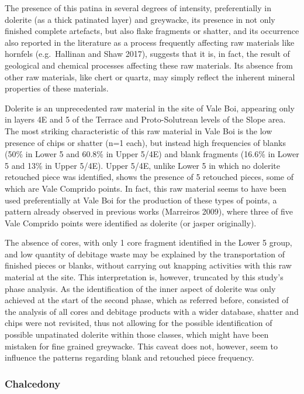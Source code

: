 \documentclass[12pt,twoside]{reedthesis}
\begin{document}
The presence of this patina in several degrees of intensity, preferentially in dolerite (as a thick patinated layer) and greywacke, its presence in not only finished complete artefacts, but also flake fragments or shatter, and its occurrence also reported in the literature as a process frequently affecting raw materials like hornfels (e.g.~Hallinan and Shaw 2017), suggests that it is, in fact, the result of geological and chemical processes affecting these raw materials. Its absence from other raw materials, like chert or quartz, may simply reflect the inherent mineral properties of these materials.

Dolerite is an unprecedented raw material in the site of Vale Boi, appearing only in layers 4E and 5 of the Terrace and Proto-Solutrean levels of the Slope area. The most striking characteristic of this raw material in Vale Boi is the low presence of chips or shatter (n=1 each), but instead high frequencies of blanks (50\% in Lower 5 and 60.8\% in Upper 5/4E) and blank fragments (16.6\% in Lower 5 and 13\% in Upper 5/4E). Upper 5/4E, unlike Lower 5 in which no dolerite retouched piece was identified, shows the presence of 5 retouched pieces, some of which are Vale Comprido points. In fact, this raw material seems to have been used preferentially at Vale Boi for the production of these types of points, a pattern already observed in previous works (Marreiros 2009), where three of five Vale Comprido points were identified as dolerite (or jasper originally).

The absence of cores, with only 1 core fragment identified in the Lower 5 group, and low quantity of debitage waste may be explained by the transportation of finished pieces or blanks, without carrying out knapping activities with this raw material at the site. This interpretation is, however, truncated by this study's phase analysis. As the identification of the inner aspect of dolerite was only achieved at the start of the second phase, which as referred before, consisted of the analysis of all cores and debitage products with a wider database, shatter and chips were not revisited, thus not allowing for the possible identification of possible unpatinated dolerite within those classes, which might have been mistaken for fine grained greywacke. This caveat does not, however, seem to influence the patterns regarding blank and retouched piece frequency.

\hypertarget{chalcedony}{%
\subsubsection{Chalcedony}\label{chalcedony}}
\end{document}
